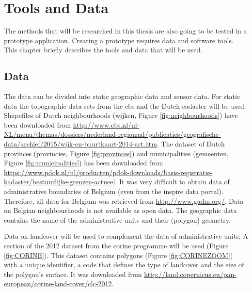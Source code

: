 

\section{Tools and Data}
\label{chap:TD}

The methods that will be researched in this thesis are also going to be tested in a prototype application. Creating a prototype requires data and software tools. This chapter briefly describes the tools and data that will be used.  

\subsection{Data}
\begin{sloppypar}
The data can be divided into static geographic data and sensor data. For static data the topographic data sets from the \ac{cbs} and the Dutch cadaster will be used. Shapefiles of Dutch neighbourhoods (wijken, Figure \ref{fig:neighbourhoods}) have been downloaded from \url{http://www.cbs.nl/nl-NL/menu/themas/dossiers/nederland-regionaal/publicaties/geografische-data/archief/2015/wijk-en-buurtkaart-2014-art.htm}. The dataset of Dutch provinces (provincies, Figure \ref{fig:provinces}) and municipalities (gemeenten, Figure \ref{fig:municipalities}) has been downloaded from \url{https://www.pdok.nl/nl/producten/pdok-downloads/basis-registratie-kadaster/bestuurlijke-grenzen-actueel}. It was very difficult to obtain data of administrative boundaries of Belgium (even from the \ac{inspire} data portal). Therefore, all data for Belgium was retrieved from \url{http://www.gadm.org/}. Data on Belgian neighbourhoods is not available as open data. The geographic data contains the name of the administrative units and their (polygon) geometry.

Data on landcover will be used to complement the data of administrative units. A section of the 2012 dataset from the \ac{corine} programme will be used (Figure \ref{fig:CORINE}). This dataset contains polygons (Figure \ref{fig:CORINEZOOM}) with a unique identifier, a code that defines the type of landcover and the size of the polygon's surface. It was downloaded from \url{http://land.copernicus.eu/pan-european/corine-land-cover/clc-2012}. 
  
\end{sloppypar}

